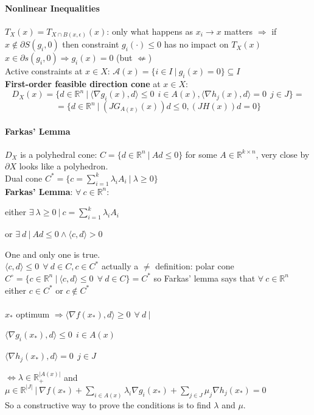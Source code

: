 \documentclass[10pt]{report}
\begin{document}
\paragraph{Nonlinear Inequalities} $T_X(x) = T_{X\cap B(x,\epsilon)}(x)$: only what happens as $x_i\rightarrow x$ matters $\Rightarrow$ if $x\not\in \partial S(g_i,0)$ then constraint $g_i(\cdot)\leq 0$ has no impact on $T_X(x)$\\
$x\in\partial s(g_i,0)\Rightarrow g_i(x)=0$ (but $\not\Leftarrow$)\\
Active constraints at $x\in X$: $\mathscr{A}(x) = \{i\in I\:|\:g_i(x)=0\}\subseteq I$\\
\textbf{First-order feasible direction cone} at $x\in X$: $$D_X(x) = \{d\in \mathbb{R}^n\:|\:\langle\nabla g_i(x), d\rangle\leq 0\:\:i\in A(x),\langle\nabla h_j(x),d\rangle = 0\:\:j\in J\}=$$ $$=\{d\in \mathbb{R}^n\:|\:(JG_{A(x)}(x))d\leq 0, (JH(x))d=0\}$$
\paragraph{Farkas' Lemma} $D_X$ is a polyhedral cone: $C=\{d\in \mathbb{R}^n\:|\:Ad\leq 0\}$ for some $A\in \mathbb{R}^{k\times n}$, very close by $\partial X$ looks like a polyhedron.\\
Dual cone $C^*=\{c=\sum_{i=1}^k\lambda_iA_i\:|\:\lambda \geq 0\}$\\
\textbf{Farkas' Lemma}: $\forall\:c\in \mathbb{R}^n$:
\begin{list}{}{}
	\item either $\exists\:\lambda\geq 0\:|\:c = \sum_{i=1}^k \lambda_iA_i$
	\item or $\exists\:d\:|\:Ad\leq 0\wedge\langle c,d\rangle > 0$
\end{list}
One and only one is true.\\
$\langle c,d\rangle \leq 0\:\:\forall\:d\in C, c\in C^*$ actually a $\neq$ definition: polar cone $C^\circ=\{c\in \mathbb{R}^n\:|\:\langle c,d\rangle\leq 0\:\:\forall\:d\in C\}=C^*$ so Farkas' lemma says that $\forall\:c\in \mathbb{R}^n$ either $c\in C^*$ or $c\not\in C^*$\\\\
$x_*$ optimum $\Rightarrow \langle\nabla f(x_*),d\rangle\geq 0\:\:\forall\:d\:|\:$
\begin{list}{}{}
	\item $\langle\nabla g_i(x_*),d\rangle\leq 0\:\:i\in A(x)$
	\item $\langle\nabla h_j(x_*),d\rangle = 0\:\:j\in J$
\end{list}
$\Leftrightarrow\lambda\in \mathbb{R}_+^{|A(x)|}$ and $\mu \in \mathbb{R}^{|J|}\:|\:\nabla f(x_*) + \sum_{i\in A(x)}\lambda_i\nabla g_i(x_*) + \sum_{j\in J} \mu_j\nabla h_j(x_*)=0$\\
So a constructive way to prove the conditions is to find $\lambda$ and $\mu$.
\end{document}
